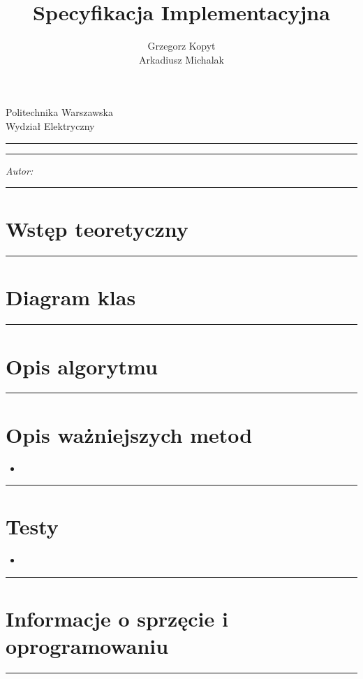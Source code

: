 \documentclass[a4paper,11pt]{article}
\author{Grzegorz Kopyt\\Arkadiusz Michalak}
\title{Specyfikacja Implementacyjna}
\makeatletter
\newcommand{\linia}{\rule{\linewidth}{0.4mm}}
\renewcommand{\maketitle}{\begin{titlepage}
    \vspace*{2cm}
    \begin{center}\LARGE
    Politechnika Warszawska\\
    Wydział Elektryczny\\
    \end{center}
    \vspace{5cm}
    \noindent\linia
    \begin{center}
      \LARGE \textsc{\@title}
         \end{center}
     \linia
    \vspace{0.5cm}
    \begin{flushright}
    \begin{minipage}{5cm}
    \textit{Autor:}\\
    \normalsize \textsc{\@author} \par
    \end{minipage}
    \vspace{5cm}
     \end{flushright}
    \vspace*{\stretch{6}}
    \begin{center}
    \@date
    \end{center}
  \end{titlepage}
}
\makeatother
\begin{document}
\maketitle

\tableofcontents
\vspace{1cm}
\noindent\linia

\section{Wstęp teoretyczny}

\noindent\linia
\section{Diagram klas}

\noindent\linia
\section{Opis algorytmu}


\noindent\linia
\section{Opis ważniejszych metod}
\begin{itemize}
\item 
\end{itemize}

\noindent\linia

\section{Testy}
\begin{itemize}
\item 
\end{itemize}

\noindent\linia
\section{Informacje o sprzęcie i oprogramowaniu}

\noindent\linia
\end{document}
